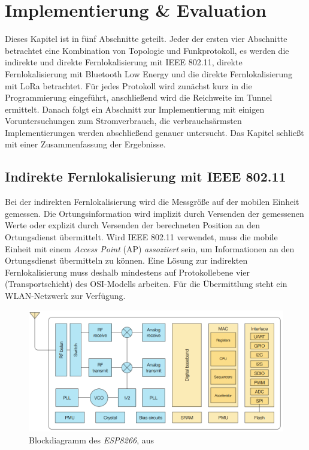 \chapter{Implementierung \& Evaluation}
\label{ch:Implementierung}
Dieses Kapitel ist in fünf Abschnitte geteilt. 
Jeder der ersten vier Abschnitte betrachtet eine Kombination von Topologie und Funkprotokoll, es werden die indirekte und direkte Fernlokalisierung mit IEEE 802.11, direkte Fernlokalisierung mit Bluetooth Low Energy und die direkte Fernlokalisierung mit LoRa betrachtet.
Für jedes Protokoll wird zunächst kurz in die Programmierung eingeführt, anschließend wird die Reichweite im Tunnel ermittelt. %
Danach folgt ein Abschnitt zur Implementierung mit einigen Voruntersuchungen zum Stromverbrauch, die verbrauchsärmsten Implementierungen werden abschließend genauer untersucht.
Das Kapitel schließt mit einer Zusammenfassung der Ergebnisse.

\section{Indirekte Fernlokalisierung mit IEEE 802.11}
\label{ch:phase1}
Bei der indirekten Fernlokalisierung wird die Messgröße auf der mobilen Einheit gemessen.
Die Ortungsinformation wird implizit durch Versenden der gemessenen Werte oder explizit durch Versenden der berechneten Position an den Ortungsdienst übermittelt.
Wird IEEE 802.11 verwendet, muss die mobile Einheit mit einem \emph{Access Point} (AP) \emph{assoziiert} sein, um Informationen an den Ortungsdienst übermitteln zu können.
Eine Lösung zur indirekten Fernlokalisierung muss deshalb mindestens auf Protokollebene vier (Transportschicht) des OSI-Modells arbeiten.
Für die Übermittlung steht ein WLAN-Netzwerk zur Verfügung.

\begin{figure}[h]
  \centering
	\includegraphics[width=\textwidth]{images/espblock.png}
  \caption{Blockdiagramm des \emph{ESP8266}, aus \cite{espressif2017esp8266}}
  \label{fig:espblock}
\end{figure}

